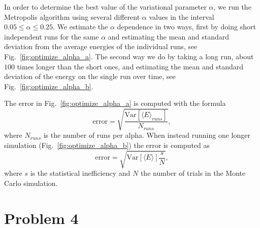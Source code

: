 In order to determine the best value of the variational parameter $\alpha$, we run the Metropolis algorithm using several different $\alpha$ values in the interval $0.05 \leq \alpha \leq 0.25$. We estimate the $\alpha$ dependence in two ways, first by doing short independent runs for the same $\alpha$ and estimating the mean and standard deviation from the average energies of the individual runs, see Fig.~\ref{fig:optimize_alpha_a}. The second way we do by taking a long run, about $100$ times longer than the short ones, and estimating the mean and standard deviation of the energy on the single run over time, see Fig.~\ref{fig:optimize_alpha_b}. 

The error in Fig.~\ref{fig:optimize_alpha_a} is computed with the formula
\begin{equation}
\mathrm{error} = \sqrt{\frac{\mathrm{Var} [ \langle E \rangle_{runs} ]}{N_{runs}}},
\end{equation}
where $N_{runs}$ is the number of runs per alpha. When instead running one longer simulation (Fig.~\ref{fig:optimize_alpha_b}) the error is computed as
\begin{equation}
\mathrm{error} = \sqrt{\mathrm{Var} [\langle E \rangle ] \frac{s}{N}},
\end{equation}
where $s$ is the statistical inefficiency and $N$ the number of trials in the Monte Carlo simulation.


\section*{Problem 4}

